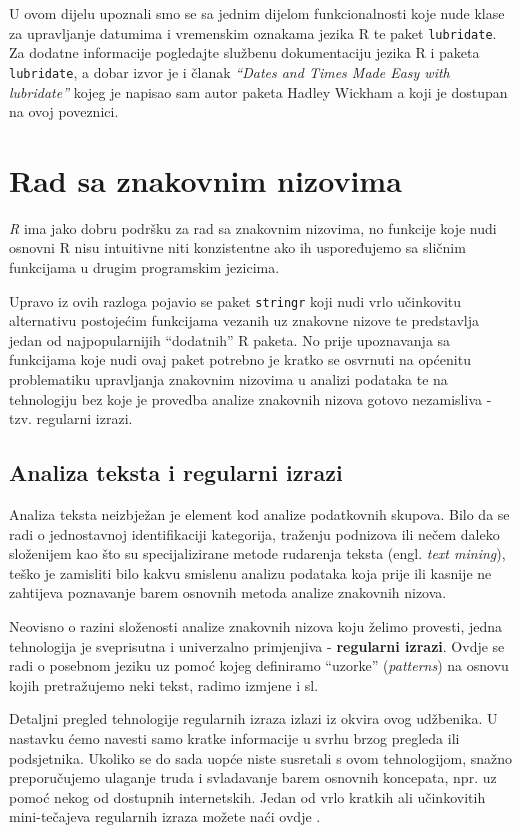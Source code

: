 \documentclass[]{book}
\theoremstyle{definition}
\theoremstyle{definition}
\theoremstyle{definition}
\theoremstyle{remark}
\begin{document}
U ovom dijelu upoznali smo se sa jednim dijelom funkcionalnosti koje
nude klase za upravljanje datumima i vremenskim oznakama jezika R te
paket \texttt{lubridate}. Za dodatne informacije pogledajte službenu
dokumentaciju jezika R i paketa \texttt{lubridate}, a dobar izvor je i
članak \emph{``Dates and Times Made Easy with lubridate''} kojeg je
napisao sam autor paketa Hadley Wickham a koji je dostupan na ovoj
poveznici.

\section{Rad sa znakovnim nizovima}\label{rad-sa-znakovnim-nizovima}

\emph{R} ima jako dobru podršku za rad sa znakovnim nizovima, no
funkcije koje nudi osnovni R nisu intuitivne niti konzistentne ako ih
uspoređujemo sa sličnim funkcijama u drugim programskim jezicima.

Upravo iz ovih razloga pojavio se paket \texttt{stringr} koji nudi vrlo
učinkovitu alternativu postojećim funkcijama vezanih uz znakovne nizove
te predstavlja jedan od najpopularnijih ``dodatnih'' R paketa. No prije
upoznavanja sa funkcijama koje nudi ovaj paket potrebno je kratko se
osvrnuti na općenitu problematiku upravljanja znakovnim nizovima u
analizi podataka te na tehnologiju bez koje je provedba analize
znakovnih nizova gotovo nezamisliva - tzv. regularni izrazi.

\subsection{Analiza teksta i regularni
izrazi}\label{analiza-teksta-i-regularni-izrazi}

Analiza teksta neizbježan je element kod analize podatkovnih skupova.
Bilo da se radi o jednostavnoj identifikaciji kategorija, traženju
podnizova ili nečem daleko složenijem kao što su specijalizirane metode
rudarenja teksta (engl. \emph{text mining}), teško je zamisliti bilo
kakvu smislenu analizu podataka koja prije ili kasnije ne zahtijeva
poznavanje barem osnovnih metoda analize znakovnih nizova.

Neovisno o razini složenosti analize znakovnih nizova koju želimo
provesti, jedna tehnologija je sveprisutna i univerzalno primjenjiva -
\textbf{regularni izrazi}. Ovdje se radi o posebnom jeziku uz pomoć
kojeg definiramo ``uzorke'' (\emph{patterns}) na osnovu kojih
pretražujemo neki tekst, radimo izmjene i sl.

Detaljni pregled tehnologije regularnih izraza izlazi iz okvira ovog
udžbenika. U nastavku ćemo navesti samo kratke informacije u svrhu brzog
pregleda ili podsjetnika. Ukoliko se do sada uopće niste susretali s
ovom tehnologijom, snažno preporučujemo ulaganje truda i svladavanje
barem osnovnih koncepata, npr. uz pomoć nekog od dostupnih internetskih.
Jedan od vrlo kratkih ali učinkovitih mini-tečajeva regularnih izraza
možete naći ovdje .
\end{document}
